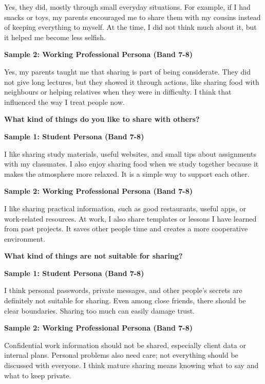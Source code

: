 Yes, they did, mostly through small everyday situations. For example, if I had snacks or toys, my parents encouraged me to share them with my cousins instead of keeping everything to myself. At the time, I did not think much about it, but it helped me become less selfish.

\textbf{Sample 2: Working Professional Persona (Band 7-8)}

Yes, my parents taught me that sharing is part of being considerate. They did not give long lectures, but they showed it through actions, like sharing food with neighbours or helping relatives when they were in difficulty. I think that influenced the way I treat people now.

\separator

\begin{ieltsquestion}
\textbf{What kind of things do you like to share with others?}
\end{ieltsquestion}
\textbf{Sample 1: Student Persona (Band 7-8)}

I like sharing study materials, useful websites, and small tips about assignments with my classmates. I also enjoy sharing food when we study together because it makes the atmosphere more relaxed. It is a simple way to support each other.

\textbf{Sample 2: Working Professional Persona (Band 7-8)}

I like sharing practical information, such as good restaurants, useful apps, or work-related resources. At work, I also share templates or lessons I have learned from past projects. It saves other people time and creates a more cooperative environment.

\separator

\begin{ieltsquestion}
\textbf{What kind of things are not suitable for sharing?}
\end{ieltsquestion}
\textbf{Sample 1: Student Persona (Band 7-8)}

I think personal passwords, private messages, and other people's secrets are definitely not suitable for sharing. Even among close friends, there should be clear boundaries. Sharing too much can easily damage trust.

\textbf{Sample 2: Working Professional Persona (Band 7-8)}

Confidential work information should not be shared, especially client data or internal plans. Personal problems also need care; not everything should be discussed with everyone. I think mature sharing means knowing what to say and what to keep private.

